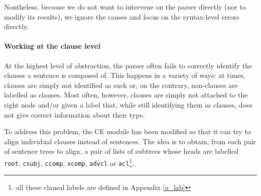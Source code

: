 Nontheless, because we do not want to intervene on the parser directly (nor to modify its results), we ignore the causes and focus on the syntax-level errors directly. \smallskip

\paragraph{Working at the clause level} \label{clauses}
At the highest level of abstraction, the parser often fails to correctly identify the clauses a sentence is composed of. This happens in a variety of ways: at times, clauses are simply not identified as such or, on the contrary, non-clauses are labelled as clauses. 
Most often, however, clauses are simply not attached to the right node and/or given a label that, while still identifying them as clauses, does not give correct information about their type. \smallskip

To address this problem, the CE module has been modified so that it can try to align individual clauses instead of sentences. The idea is to obtain, from each pair of sentence trees to align, a pair of lists of subtrees whose heads are labelled \texttt{root}, \texttt{csubj}, \texttt{ccomp}, \texttt{xcomp}, \texttt{advcl} or  \texttt{acl}\footnote{all these clausal labels are defined in Appendix \ref{a_lab}}.

